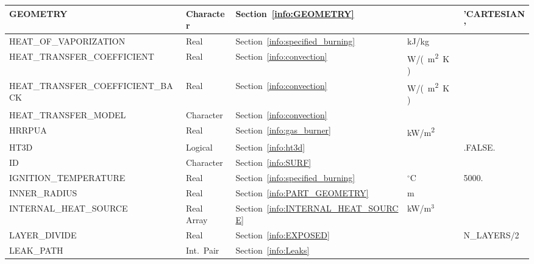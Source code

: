 \documentclass[11pt]{book}
\begin{document}
\begin{longtable}{@{\extracolsep{\fill}}|l|l|l|l|l|}
{\ct GEOMETRY}                          & Character       & Section~\ref{info:GEOMETRY}               &                     & {\ct 'CARTESIAN'}       \\ \hline
{\ct HEAT\_OF\_VAPORIZATION}            & Real            & Section~\ref{info:specified_burning}      & kJ/kg               &                         \\ \hline
{\ct HEAT\_TRANSFER\_COEFFICIENT}       & Real            & Section~\ref{info:convection}             & \si{W/(m^2.K)}      &                         \\ \hline
{\ct \footnotesize HEAT\_TRANSFER\_COEFFICIENT\_BACK} & Real            & Section~\ref{info:convection}             & \si{W/(m^2.K)}      &                         \\ \hline
{\ct HEAT\_TRANSFER\_MODEL}             & Character       & Section~\ref{info:convection}             &                     &                         \\ \hline
{\ct HRRPUA}                            & Real            & Section~\ref{info:gas_burner}             & \si{kW/m^2}         &                         \\ \hline
{\ct HT3D}                              & Logical         & Section~\ref{info:ht3d}                   &                     & {\ct .FALSE.}           \\ \hline
{\ct ID}                                & Character       & Section~\ref{info:SURF}                   &                     &                         \\ \hline
{\ct IGNITION\_TEMPERATURE}             & Real            & Section~\ref{info:specified_burning}      & $^\circ$C           & 5000.                   \\ \hline
{\ct INNER\_RADIUS}                     & Real            & Section~\ref{info:PART_GEOMETRY}          & m                   &                         \\ \hline
{\ct INTERNAL\_HEAT\_SOURCE}            & Real Array      & Section~\ref{info:INTERNAL_HEAT_SOURCE}   & kW/m$^3$            &                         \\ \hline
{\ct LAYER\_DIVIDE}                     & Real            & Section~\ref{info:EXPOSED}                &                     & {\ct N\_LAYERS}/2       \\ \hline
{\ct LEAK\_PATH}                        & Int.~Pair       & Section~\ref{info:Leaks}                  &                     &                         \\ \hline

\end{longtable}
\end{document}
